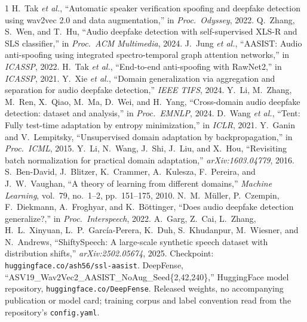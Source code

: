 \documentclass[conference]{IEEEtran}
\begin{document}
\begin{thebibliography}{1}
 H.~Tak \emph{et al.}, ``Automatic speaker verification
spoofing and deepfake detection using wav2vec 2.0 and data augmentation,'' in
\emph{Proc.\ Odyssey}, 2022.
 Q.~Zhang, S.~Wen, and T.~Hu, ``Audio deepfake detection with
self-supervised XLS-R and SLS classifier,'' in \emph{Proc.\ ACM Multimedia},
2024.
 J.~Jung \emph{et al.}, ``AASIST: Audio anti-spoofing using
integrated spectro-temporal graph attention networks,'' in \emph{ICASSP}, 2022.
 H.~Tak \emph{et al.}, ``End-to-end anti-spoofing with RawNet2,''
in \emph{ICASSP}, 2021.
 Y.~Xie \emph{et al.}, ``Domain generalization via aggregation and
separation for audio deepfake detection,'' \emph{IEEE TIFS}, 2024.
 Y.~Li, M.~Zhang, M.~Ren, X.~Qiao, M.~Ma, D.~Wei, and
H.~Yang, ``Cross-domain audio deepfake detection: dataset and analysis,'' in
\emph{Proc.\ EMNLP}, 2024.
 D.~Wang \emph{et al.}, ``Tent: Fully test-time adaptation by
entropy minimization,'' in \emph{ICLR}, 2021.
 Y.~Ganin and V.~Lempitsky, ``Unsupervised domain adaptation by
backpropagation,'' in \emph{Proc.\ ICML}, 2015.
 Y.~Li, N.~Wang, J.~Shi, J.~Liu, and X.~Hou, ``Revisiting batch
normalization for practical domain adaptation,'' \emph{arXiv:1603.04779}, 2016.
 S.~Ben-David, J.~Blitzer, K.~Crammer, A.~Kulesza,
F.~Pereira, and J.~W.~Vaughan, ``A theory of learning from different
domains,'' \emph{Machine Learning}, vol.\ 79, no.\ 1--2, pp.\ 151--175, 2010.
 N.~M.~M\"uller, P.~Czempin, F.~Diekmann, A.~Froghyar, and
K.~B\"ottinger, ``Does audio deepfake detection generalize?,'' in \emph{Proc.\
Interspeech}, 2022.
 A.~Garg, Z.~Cai, L.~Zhang, H.~L.~Xinyuan,
L.~P.~Garc\'ia-Perera, K.~Duh, S.~Khudanpur, M.~Wiesner, and N.~Andrews,
``ShiftySpeech: A large-scale synthetic speech dataset with distribution
shifts,'' \emph{arXiv:2502.05674}, 2025. Checkpoint:
\texttt{huggingface.co/ash56/ssl-aasist}.
 DeepFense, ``ASV19\_Wav2Vec2\_AASIST\_NoAug\_Seed\{2,42,240\},''
HuggingFace model repository,
\texttt{huggingface.co/DeepFense}. Released weights, no
accompanying publication or model card; training corpus and label convention
read from the repository's \texttt{config.yaml}.
\end{thebibliography}
\end{document}
